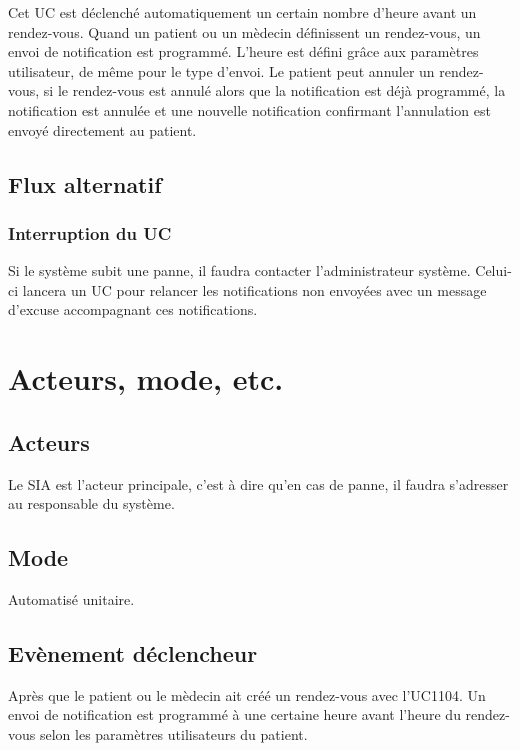 Cet UC est déclenché automatiquement un certain nombre d'heure avant un rendez-vous. Quand un patient ou un mèdecin
définissent un rendez-vous, un envoi de notification est programmé. L'heure est défini grâce aux paramètres utilisateur, de même
pour le type d'envoi. Le patient peut annuler un rendez-vous, si le rendez-vous est annulé alors que la notification est déjà
programmé, la notification est annulée et une nouvelle notification confirmant l'annulation est envoyé directement au 
patient.

\subsection{Flux alternatif}

\subsubsection{Interruption du UC}

Si le système subit une panne, il faudra contacter l'administrateur système.
Celui-ci lancera un UC pour relancer les notifications non envoyées avec un message d'excuse accompagnant ces
notifications.


\section{Acteurs, mode, etc.}

\subsection{Acteurs}

Le SIA est l'acteur principale, c'est à dire qu'en cas de panne, il faudra s'adresser au 
responsable du système.

\subsection{Mode}

Automatisé unitaire.

\subsection{Evènement déclencheur}

Après que le patient ou le mèdecin ait créé un rendez-vous avec l'UC1104. 
Un envoi de notification est programmé à une certaine heure avant l'heure du rendez-vous selon les 
paramètres utilisateurs du patient.

